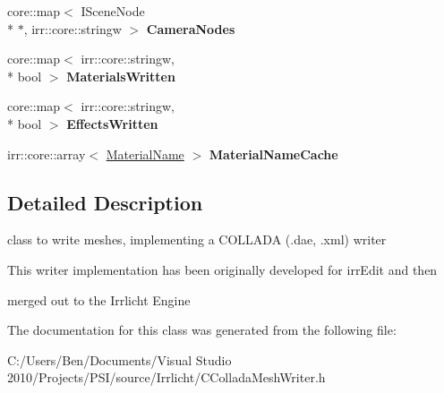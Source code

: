 \begin{DoxyCompactItemize}
\item 
\hypertarget{classirr_1_1scene_1_1_c_collada_mesh_writer_a1f2bc1b30cd9f4c6bbfc66f06c0cdc78}{core\-::map$<$ I\-Scene\-Node \\*
$\ast$, irr\-::core\-::stringw $>$ {\bfseries Camera\-Nodes}}\label{classirr_1_1scene_1_1_c_collada_mesh_writer_a1f2bc1b30cd9f4c6bbfc66f06c0cdc78}

\item 
\hypertarget{classirr_1_1scene_1_1_c_collada_mesh_writer_a41d765128bc47f70196ec2fed61ce338}{core\-::map$<$ irr\-::core\-::stringw, \\*
bool $>$ {\bfseries Materials\-Written}}\label{classirr_1_1scene_1_1_c_collada_mesh_writer_a41d765128bc47f70196ec2fed61ce338}

\item 
\hypertarget{classirr_1_1scene_1_1_c_collada_mesh_writer_ad1b7fef37a2e6bfbad217864a051b7ce}{core\-::map$<$ irr\-::core\-::stringw, \\*
bool $>$ {\bfseries Effects\-Written}}\label{classirr_1_1scene_1_1_c_collada_mesh_writer_ad1b7fef37a2e6bfbad217864a051b7ce}

\item 
\hypertarget{classirr_1_1scene_1_1_c_collada_mesh_writer_aae1975c5b6517b8d65fab687416e5ff9}{irr\-::core\-::array$<$ \hyperlink{structirr_1_1scene_1_1_c_collada_mesh_writer_1_1_material_name}{Material\-Name} $>$ {\bfseries Material\-Name\-Cache}}\label{classirr_1_1scene_1_1_c_collada_mesh_writer_aae1975c5b6517b8d65fab687416e5ff9}

\end{DoxyCompactItemize}


\subsection{Detailed Description}
class to write meshes, implementing a C\-O\-L\-L\-A\-D\-A (.dae, .xml) writer 

\begin{DoxyVerb}This writer implementation has been originally developed for irrEdit and then
\end{DoxyVerb}
 merged out to the Irrlicht Engine 

The documentation for this class was generated from the following file\-:\begin{DoxyCompactItemize}
\item 
C\-:/\-Users/\-Ben/\-Documents/\-Visual Studio 2010/\-Projects/\-P\-S\-I/source/\-Irrlicht/C\-Collada\-Mesh\-Writer.\-h\end{DoxyCompactItemize}
